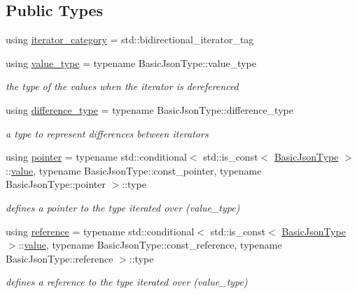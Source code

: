 \subsection*{Public Types}
\begin{DoxyCompactItemize}
\item 
using \hyperlink{classnlohmann_1_1detail_1_1iter__impl_ad9e091f5c70b34b5b1abc1ab15fd9106}{iterator\+\_\+category} = std\+::bidirectional\+\_\+iterator\+\_\+tag
\item 
using \hyperlink{classnlohmann_1_1detail_1_1iter__impl_ab35586a44f2222272c5346baa3013f67}{value\+\_\+type} = typename Basic\+Json\+Type\+::value\+\_\+type
\begin{DoxyCompactList}\small\item\em the type of the values when the iterator is dereferenced \end{DoxyCompactList}\item 
using \hyperlink{classnlohmann_1_1detail_1_1iter__impl_a2f7ea9f7022850809c60fc3263775840}{difference\+\_\+type} = typename Basic\+Json\+Type\+::difference\+\_\+type
\begin{DoxyCompactList}\small\item\em a type to represent differences between iterators \end{DoxyCompactList}\item 
using \hyperlink{classnlohmann_1_1detail_1_1iter__impl_a69e52f890ce8c556fd68ce109e24b360}{pointer} = typename std\+::conditional$<$ std\+::is\+\_\+const$<$ \hyperlink{classnlohmann_1_1detail_1_1iter__impl_abf18f18793f84b0222aebb5a2a87da7a}{Basic\+Json\+Type} $>$\+::\hyperlink{classnlohmann_1_1detail_1_1iter__impl_ab447c50354c6611fa2ae0100ac17845c}{value}, typename Basic\+Json\+Type\+::const\+\_\+pointer, typename Basic\+Json\+Type\+::pointer $>$\+::type
\begin{DoxyCompactList}\small\item\em defines a pointer to the type iterated over (value\+\_\+type) \end{DoxyCompactList}\item 
using \hyperlink{classnlohmann_1_1detail_1_1iter__impl_a5be8001be099c6b82310f4d387b953ce}{reference} = typename std\+::conditional$<$ std\+::is\+\_\+const$<$ \hyperlink{classnlohmann_1_1detail_1_1iter__impl_abf18f18793f84b0222aebb5a2a87da7a}{Basic\+Json\+Type} $>$\+::\hyperlink{classnlohmann_1_1detail_1_1iter__impl_ab447c50354c6611fa2ae0100ac17845c}{value}, typename Basic\+Json\+Type\+::const\+\_\+reference, typename Basic\+Json\+Type\+::reference $>$\+::type
\begin{DoxyCompactList}\small\item\em defines a reference to the type iterated over (value\+\_\+type) \end{DoxyCompactList}\end{DoxyCompactItemize}
